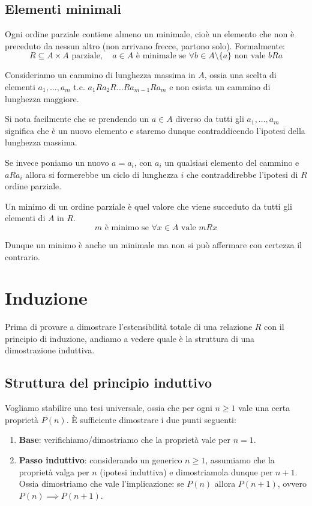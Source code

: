 \documentclass[12pt]{report}
\begin{document}
	\section{Elementi minimali}
	
	Ogni ordine parziale contiene almeno un minimale, cioè un elemento che non è preceduto da nessun altro (non arrivano frecce, partono solo). Formalmente:
	\[
	R \subseteq A \times A \text{ parziale}, \quad a \in A \text{ è minimale se } \forall b \in A \setminus \{a\} \text{ non vale } bRa
	\]
	
	\begin{dimostrazione}{}{}
		Consideriamo un cammino di lunghezza massima in $A$, ossia una scelta di elementi $a_1, \dots, a_m$ t.c. $a_1 R a_2 R \dots R a_{m-1} R a_m$ e non esista un cammino di lunghezza maggiore.
		
		Si nota facilmente che se prendendo un $a \in A$ diverso da tutti gli $a_1, \dots, a_m$ significa che è un nuovo elemento e staremo dunque contraddicendo l'ipotesi della lunghezza massima.
		
		Se invece poniamo un nuovo $a = a_i$, con $a_i$ un qualsiasi elemento del cammino e $a R a_i$ allora si formerebbe un ciclo di lunghezza $i$ che contraddirebbe l'ipotesi di $R$ ordine parziale.
	\end{dimostrazione}
	
	Un minimo di un ordine parziale è quel valore che viene succeduto da tutti gli elementi di $A$ in $R$.
	\[
	m \text{ è minimo se } \forall x \in A \text{ vale } mRx
	\]
	
	Dunque un minimo è anche un minimale ma non si può affermare con certezza il contrario.
	
	\chapter{Induzione}
	
	Prima di provare a dimostrare l'estensibilità totale di una relazione $R$ con il principio di induzione, andiamo a vedere quale è la struttura di una dimostrazione induttiva.
	
	\section{Struttura del principio induttivo}
	Vogliamo stabilire una tesi universale, ossia che per ogni $n \geq 1$ vale una certa proprietà $P(n)$.
	È sufficiente dimostrare i due punti seguenti:
	\begin{enumerate}
		\item \textbf{Base}: verifichiamo/dimostriamo che la proprietà vale per $n = 1$.
		\item \textbf{Passo induttivo}: considerando un generico $n \geq 1$, assumiamo che la proprietà valga per $n$ (ipotesi induttiva) e dimostriamola dunque per $n+1$. Ossia dimostriamo che vale l'implicazione: se $P(n)$ allora $P(n+1)$, ovvero $P(n) \implies P(n+1)$.
	\end{enumerate}
	
\end{document}
